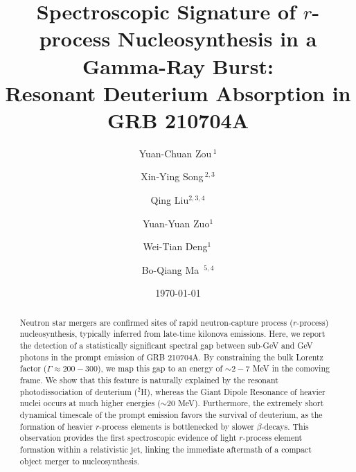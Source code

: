 \documentclass[prd,twocolumn,amsmath,amssymb,aps]{revtex4-2} %
\begin{document}
\title{Spectroscopic Signature of $r$-process Nucleosynthesis in a Gamma-Ray Burst: \\ Resonant Deuterium Absorption in GRB 210704A}

\author{Yuan-Chuan Zou\,$^{1}$}


\author{Xin-Ying Song\,$^{2,3}$}


\author{Qing Liu$^{2,3,4}$}



\author{Yuan-Yuan Zuo$^{1}$}
\author{Wei-Tian Deng$^{1}$\,}


\author{Bo-Qiang Ma\, $^{5,4}$}


\date{\today}

\begin{abstract}
Neutron star mergers are confirmed sites of rapid neutron-capture process ($r$-process) nucleosynthesis, typically inferred from late-time kilonova emissions. Here, we report the detection of a statistically significant spectral gap between sub-GeV and GeV photons in the prompt emission of GRB 210704A. By constraining the bulk Lorentz factor ($\Gamma \approx 200-300$), we map this gap to an energy of $\sim 2-7$ MeV in the comoving frame. We show that this feature is naturally explained by the resonant photodissociation of deuterium ($^2$H), whereas the Giant Dipole Resonance of heavier nuclei occurs at much higher energies ($\sim 20$ MeV). Furthermore, the extremely short dynamical timescale of the prompt emission favors the survival of deuterium, as the formation of heavier $r$-process elements is bottlenecked by slower $\beta$-decays. This observation provides the first spectroscopic evidence of light $r$-process element formation within a relativistic jet, linking the immediate aftermath of a compact object merger to nucleosynthesis.
\end{abstract}
\end{document}
